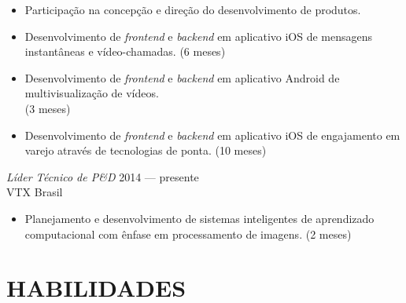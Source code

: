 \documentclass[]{res} %
\newcommand{\sbt}{\,\begin{picture}(-1,1)(-2,-3)\circle*{2}\end{picture}\ }
\def \divspace{6pt}
\def \myitemback{0.55cm}
\def \myitemsep{0pt}
\def \mypositionface{\sl}
\def \myorgface{\sc}
\begin{document}
\begin{resume}
\begin{itemize}[itemsep=\myitemsep,leftmargin=\myitemback]
\item[\sbt] Participação na concepção e direção do desenvolvimento de produtos.
\item[\sbt] Desenvolvimento de {\it frontend} e {\it backend} em aplicativo iOS de mensagens instantâneas e vídeo-chamadas. (6 meses)
\item[\sbt] Desenvolvimento de {\it frontend} e {\it backend} em aplicativo Android de multivisualização de vídeos.\\ (3 meses)
\item[\sbt] Desenvolvimento de {\it frontend} e {\it backend} em aplicativo iOS de engajamento em varejo através de tecnologias de ponta. (10 meses)
\end{itemize}

{\mypositionface Líder Técnico de P\&D} \hfill 2014 — presente \\
{\myorgface VTX Brasil}

\begin{itemize}[itemsep=\myitemsep,leftmargin=\myitemback]
\item[\sbt] Planejamento e desenvolvimento de sistemas inteligentes de aprendizado computacional com ênfase em processamento de imagens. (2 meses)
\end{itemize}

\section{HABILIDADES \hspace{\divspace} }


\end{resume}
\end{document}
